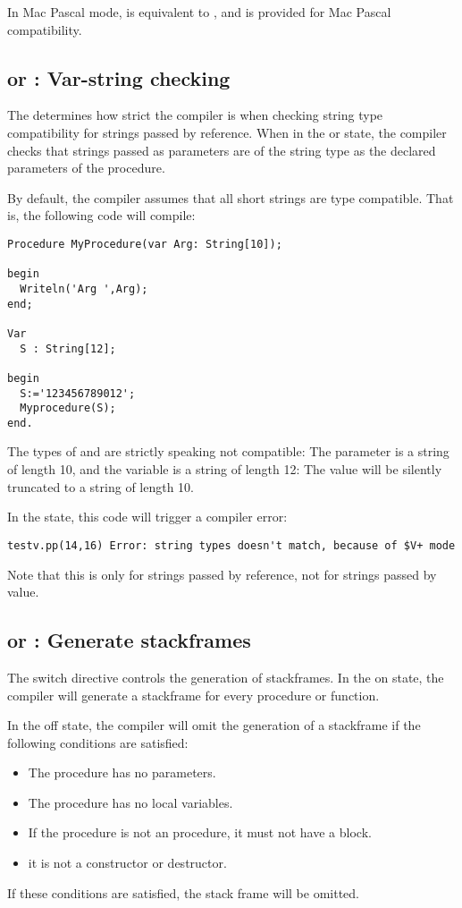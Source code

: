 In Mac Pascal mode,  is equivalent to , and is 
provided for Mac Pascal compatibility.


\subsection{ or  : Var-string checking}

The  determines how strict the compiler is when 
checking string type compatibility for strings passed by reference. When in the \var{+} or  state, 
the compiler checks that strings passed as parameters are of the string type as the declared
parameters of the procedure.

By default, the compiler assumes that all short strings are type compatible.
That is, the following code will compile:
\begin{verbatim}
Procedure MyProcedure(var Arg: String[10]);

begin
  Writeln('Arg ',Arg);
end;

Var
  S : String[12];

begin
  S:='123456789012';
  Myprocedure(S);
end.
\end{verbatim}
The types of  and  are strictly speaking not compatible:
The  parameter is a string of length 10, and the variable 
is a string of length 12: The value will be silently truncated to a string
of length 10.

In the  state, this code will trigger a compiler error:
\begin{verbatim}
testv.pp(14,16) Error: string types doesn't match, because of $V+ mode
\end{verbatim}
Note that this is only for strings passed by reference, not for strings
passed by value.

\subsection{ or  : Generate stackframes}

The  switch directive controls the generation of stackframes.
In the on state, the compiler will generate a
stackframe for every procedure or function.

In the off state, the compiler will omit the generation of a stackframe if
the following conditions are satisfied:
\begin{itemize}
\item The procedure has no parameters.
\item The procedure has no local variables.
\item If the procedure is not an  procedure, it must not have
a  block.
\item it is not a constructor or destructor.
\end{itemize}
If these conditions are satisfied, the stack frame will be omitted.


